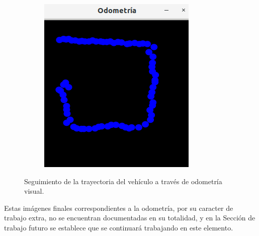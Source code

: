 \begin{figure}[htbp!]
\begin{subfigure}[htbp!]{0.4\textwidth}
		\includegraphics[width=\textwidth]{./Figuras/Odo2}
	\end{subfigure}
	\caption{Seguimiento de la trayectoria del vehículo a través de odometría visual.}
	\label{fig:odom}
\end{figure}
\par Estas imágenes finales correspondientes a la odometría, por su caracter de trabajo extra, no se encuentran documentadas en su totalidad, y en la Sección de trabajo futuro se establece que se continuará trabajando en este elemento.